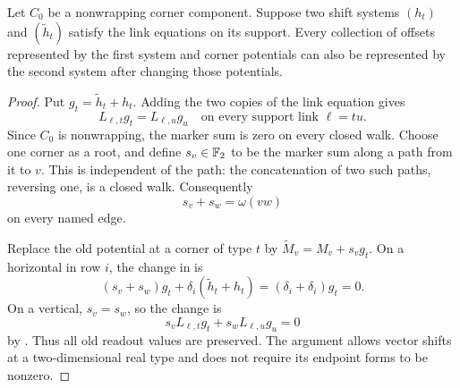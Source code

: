 \begin{lemma}
\label{offset:lem-gauge}
Let \(C_0\) be a nonwrapping corner component. Suppose two shift systems
\((h_t)\) and \((\widetilde h_t)\) satisfy the link equations on its
support. Every collection of offsets represented by the first system
and corner potentials can also be represented by the second system
after changing those potentials.
\end{lemma}

\begin{proof}
Put \(g_t=\widetilde h_t+h_t\). Adding the two copies of the link
equation gives
\begin{equation}
   L_{\ell,t}g_t=L_{\ell,u}g_u
   \quad\text{on every support link }\ell=tu.
   \label{offset:eq-shift-difference}
\end{equation}
Since \(C_0\) is nonwrapping, the marker sum is zero on every closed walk.
Choose one corner as a root, and define \(s_v\in\mathbb F_2\) to be the marker sum
along a path from it to \(v\). This is independent of the path: the
concatenation of two such paths, reversing one, is a closed walk.
Consequently
\[
     s_v+s_w=\omega(vw)
\]
on every named edge.

Replace the old potential at a corner of type \(t\) by
\(\widetilde M_v=M_v+s_vg_t\). On a horizontal in row \(i\), the change
in  is
\[
 (s_v+s_w)g_t+\delta_i(\widetilde h_t+h_t)
       =(\delta_i+\delta_i)g_t=0.
\]
On a vertical, \(s_v=s_w\), so the change is
\[
 s_vL_{\ell,t}g_t+s_wL_{\ell,u}g_u=0
\]
by . Thus all old readout values are
preserved. The argument allows vector shifts at a two-dimensional
real type and does not require its endpoint forms to be nonzero.
\end{proof}

